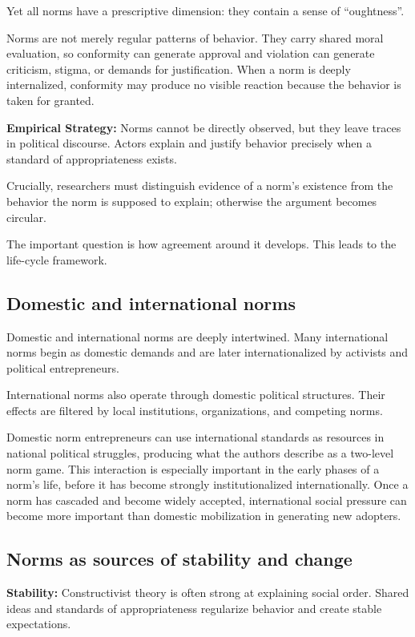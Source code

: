 Yet all norms have a prescriptive dimension: they contain a sense of ``oughtness''.

Norms are not merely regular patterns of behavior. They carry shared moral evaluation, so conformity can generate approval and violation can generate criticism, stigma, or demands for justification. When a norm is deeply internalized, conformity may produce no visible reaction because the behavior is taken for granted.

\textbf{Empirical Strategy:} Norms cannot be directly observed, but they leave traces in political discourse. Actors explain and justify behavior precisely when a standard of appropriateness exists.

Crucially, researchers must distinguish evidence of a norm's existence from the behavior the norm is supposed to explain; otherwise the argument becomes circular.

The important question is how agreement around it develops. This leads to the life-cycle framework.

\subsection{Domestic and international norms}

Domestic and international norms are deeply intertwined. Many international norms begin as domestic demands and are later internationalized by activists and political entrepreneurs.

International norms also operate through domestic political structures. Their effects are filtered by local institutions, organizations, and competing norms.

Domestic norm entrepreneurs can use international standards as resources in national political struggles, producing what the authors describe as a two-level norm game. This interaction is especially important in the early phases of a norm's life, before it has become strongly institutionalized internationally. Once a norm has cascaded and become widely accepted, international social pressure can become more important than domestic mobilization in generating new adopters.

\subsection{Norms as sources of stability and change}

\textbf{Stability:} Constructivist theory is often strong at explaining social order. Shared ideas and standards of appropriateness regularize behavior and create stable expectations.

